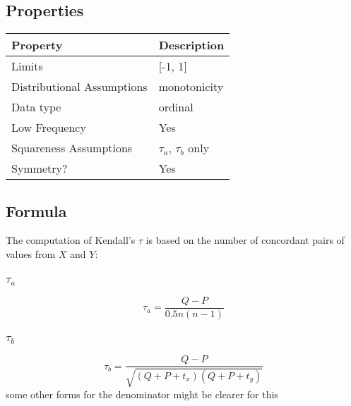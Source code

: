 \documentclass[11pt]{article}
\begin{document}
\subsection{Properties}
\begin{tabular}{| l || l |}
    \hline
    {\bf Property} & {\bf Description} \\
    \hline
    Limits & [-1, 1] \\ \hline

    Distributional Assumptions & monotonicity\\ \hline

    Data type & ordinal \\ \hline

    Low Frequency & Yes \\ \hline

    Squareness Assumptions & $\tau_a$, $\tau_b$ only \\ \hline
    
    Symmetry? & Yes \\ \hline

\end{tabular}


\subsection{Formula}
\label{section:kendalltau:formula}
The computation of Kendall's $\tau$ is based on the number of concordant pairs of values from $X$ and $Y$:

\subsubsection{$\tau_a$}
$$
\tau_a = \frac{Q-P}{0.5 n (n-1)}
$$

\subsubsection{$\tau_b$}
$$
\tau_b = \frac{Q-P}{ \sqrt{(Q + P + t_x)(Q + P + t_y)}  }
$$
{\color{red} some other forms for the denominator might be clearer for this}
\end{document}
